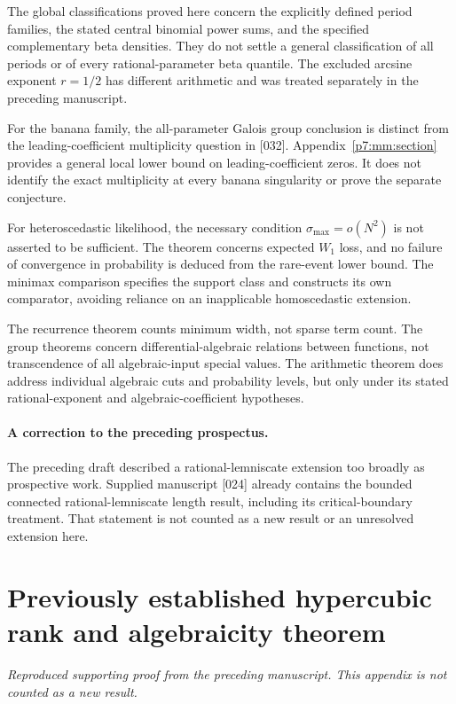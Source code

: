 \documentclass[11pt,a4paper]{article}
\theoremstyle{definition}
\theoremstyle{remark}
\numberwithin{equation}{section}
\newcommand{\collectedappendix}{%
 \setcounter{section}{0}%
 \renewcommand{\thesection}{\Roman{part}.\Alph{section}}%
 \renewcommand{\theHsection}{p\arabic{part}.a\arabic{section}}%
}
\begin{document}
The global classifications proved here concern the explicitly defined
period families, the stated central binomial power sums, and the
specified complementary beta densities. They do not settle a general
classification of all periods or of every rational-parameter beta
quantile. The excluded arcsine exponent $r=1/2$ has different
arithmetic and was treated separately in the preceding manuscript.

For the banana family, the all-parameter Galois group conclusion is
distinct from the leading-coefficient multiplicity question in [032].
Appendix~\ref{p7:mm:section} provides a general local lower bound on
leading-coefficient zeros. It does not identify the exact multiplicity
at every banana singularity or prove the separate conjecture.

For heteroscedastic likelihood, the necessary condition
$\sigma_{\max}=o(N^2)$ is not asserted to be sufficient. The theorem
concerns expected $W_1$ loss, and no failure of convergence in
probability is deduced from the rare-event lower bound. The minimax
comparison specifies the support class and constructs its own
comparator, avoiding reliance on an inapplicable homoscedastic
extension.

The recurrence theorem counts minimum width, not sparse term count.
The group theorems concern differential-algebraic relations between
functions, not transcendence of all algebraic-input special values.
The arithmetic theorem does address individual algebraic cuts and
probability levels, but only under its stated rational-exponent and
algebraic-coefficient hypotheses.

\paragraph{A correction to the preceding prospectus.}
The preceding draft described a rational-lemniscate extension too broadly
as prospective work. Supplied manuscript [024] already contains the
bounded connected rational-lemniscate length result, including its
critical-boundary treatment. That statement is not counted as a new
result or an unresolved extension here.



\clearpage
\collectedappendix

\section{Previously established hypercubic rank and algebraicity theorem}
\label{p7:bg:sec}
\noindent\textit{Reproduced supporting proof from the preceding manuscript. This appendix is not counted as a new result.}
\end{document}
